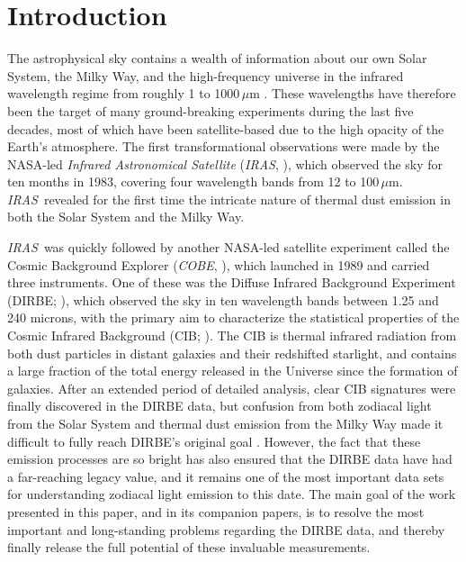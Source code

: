 \documentclass{aa}
\def\COBE{\textit{COBE}}
\def\IRAS{\textit{{IRAS}}}
\begin{document}

   \maketitle

   
\section{Introduction}


The astrophysical sky contains a wealth of information about our own Solar System, the Milky Way, and the high-frequency universe in the infrared wavelength regime from roughly 1 to 1000\,$\mu$m \citep[e.g.,][]{johnson:1966,soifer:1987,gardner:2006}. These wavelengths have therefore been the target of many ground-breaking experiments during the last five decades, most of which have been satellite-based due to the high opacity of the Earth's atmosphere. The first transformational observations were made by the NASA-led \textit{Infrared Astronomical Satellite} (\IRAS, \citealt{neugebauer:1984}), which observed the sky for ten months in 1983, covering four wavelength bands from 12 to 100$\,\mu$m. \IRAS\ revealed for the first time the intricate nature of thermal dust emission in both the Solar System and the Milky Way.

\IRAS\ was quickly followed by another NASA-led satellite experiment called the Cosmic Background Explorer (\COBE, \citealt{boggess92}), which launched in 1989 and carried three instruments. One of these was the Diffuse Infrared Background Experiment (DIRBE; \citealp{hauser1998}), which observed the sky in ten wavelength bands between 1.25 and 240 microns, with the primary aim to characterize the statistical properties of the Cosmic Infrared Background (CIB; \citealp{partridge1967}). The CIB is thermal infrared radiation from both dust particles in distant galaxies and their redshifted starlight, and contains a large fraction of the total energy released in the Universe since the formation of galaxies. After an extended period of detailed analysis, clear CIB signatures were finally discovered in the DIRBE data, but confusion from both zodiacal light from the Solar System and thermal dust emission from the Milky Way made it difficult to fully reach DIRBE's original goal \citep{arendt1998,hauser1998,kelsall1998}. However, the fact that these emission processes are so bright has also ensured that the DIRBE data have had a far-reaching legacy value, and it remains one of the most important data sets for understanding zodiacal light emission to this date. The main goal of the work presented in this paper, and in its companion papers, is to resolve the most important and long-standing problems regarding the DIRBE data, and thereby finally release the full potential of these invaluable measurements. 
\end{document}
